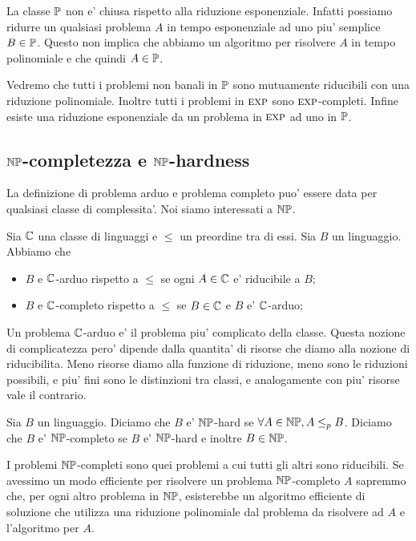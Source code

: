 La classe $\mathbb{P}$ non e' chiusa rispetto alla riduzione esponenziale. Infatti possiamo ridurre un
qualsiasi problema $A$ in tempo esponenziale ad uno piu' semplice $B \in \mathbb{P}$. Questo non
implica che abbiamo un algoritmo per risolvere $A$ in tempo polinomiale e che quindi $A \in
\mathbb{P}$.

Vedremo che tutti i problemi non banali in $\mathbb{P}$ sono mutuamente riducibili con una riduzione
polinomiale. Inoltre tutti i problemi in $\textsc{exp}$ sono $\textsc{exp}$-completi. Infine esiste una riduzione
esponenziale da un problema in $\textsc{exp}$ ad uno in $\mathbb{P}$.


\subsection{$\mathbb{NP}$-completezza e $\mathbb{NP}$-hardness}

La definizione di problema arduo e problema completo puo' essere data per qualsiasi classe di
complessita'. Noi siamo interessati a $\mathbb{NP}$.

\begin{defn}
    Sia $\mathbb{C}$ una classe di linguaggi e $\leq$ un preordine tra di essi. Sia $B$ un linguaggio.
    Abbiamo che
    \begin{itemize}
        \item $B$ e $\mathbb{C}$-arduo rispetto a $\leq$ se ogni $A \in \mathbb{C}$ e' riducibile a $B$;
        \item $B$ e $\mathbb{C}$-completo rispetto a $\leq$ se $B \in \mathbb{C}$ e $B$ e' $\mathbb{C}$-arduo;
    \end{itemize}
\end{defn}

Un problema $\mathbb{C}$-arduo e' il problema piu' complicato della classe. Questa nozione di
complicatezza pero' dipende dalla quantita' di risorse che diamo alla nozione di riducibilita.  Meno
risorse diamo alla funzione di riduzione, meno sono le riduzioni possibili, e piu' fini sono le
distinzioni tra classi, e analogamente con piu' risorse vale il contrario.

\begin{defn}
    Sia $B$ un linguaggio. Diciamo che $B$ e' $\mathbb{NP}$-hard se $\forall A \in \mathbb{NP}, A \leq_{p}
    B$. Diciamo che $B$ e' $\mathbb{NP}$-completo se $B$ e' $\mathbb{NP}$-hard e inoltre $B \in \mathbb{NP}$.
\end{defn}

I problemi $\mathbb{NP}$-completi sono quei problemi a cui tutti gli altri sono riducibili. Se avessimo
un modo efficiente per risolvere un problema $\mathbb{NP}$-completo $A$ sapremmo che, per ogni altro
problema in $\mathbb{NP}$, esisterebbe un algoritmo efficiente di soluzione che utilizza una riduzione
polinomiale dal problema da risolvere ad $A$ e l'algoritmo per $A$.

